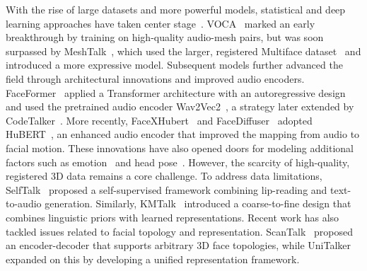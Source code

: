 \documentclass[a4paper, 10pt, conference]{ieeeconf}      %
\begin{document}
With the rise of large datasets and more powerful models, statistical and deep learning approaches have taken center stage~\cite{VOCA2019, richard2021meshtalk, Fan_Lin_Saito_Wang_Komura_faceformer_2022, facexhubert, Thambiraja_2023_ICCV_imitator, thambiraja2023_3diface, landmarks_3D_Nocentini_2023, xing2023codetalker, FaceDiffuser_Stan_MIG2023, nocentini2024scantalk3dtalkingheads, nocentini2024emovocaspeechdrivenemotional3d, nocentini2024fixedtopologiesunregisteredtraining, nocentini2026freetalkemotionaltopologyfree3d}. VOCA~\cite{VOCA2019} marked an early breakthrough by training on high-quality audio-mesh pairs, but was soon surpassed by MeshTalk~\cite{richard2021meshtalk}, which used the larger, registered Multiface dataset~\cite{wuu2022multiface} and introduced a more expressive model.
Subsequent models further advanced the field through architectural innovations and improved audio encoders. FaceFormer~\cite{Fan_Lin_Saito_Wang_Komura_faceformer_2022} applied a Transformer architecture with an autoregressive design and used the pretrained audio encoder Wav2Vec2~\cite{wav2vec_2019}, a strategy later extended by CodeTalker~\cite{xing2023codetalker}. More recently, FaceXHubert~\cite{facexhubert} and FaceDiffuser~\cite{FaceDiffuser_Stan_MIG2023} adopted HuBERT~\cite{Hubert_audio_encoding}, an enhanced audio encoder that improved the mapping from audio to facial motion.
These innovations have also opened doors for modeling additional factors such as emotion~\cite{peng2023emotalk, danvevcek2023emotional, Wu_2024} and head pose~\cite{SadTalker_2023, sun2023diffposetalk}. However, the scarcity of high-quality, registered 3D data remains a core challenge. To address data limitations, SelfTalk~\cite{peng2023selftalk} proposed a self-supervised framework combining lip-reading and text-to-audio generation. Similarly, KMTalk~\cite{xu2024kmtalkspeechdriven3dfacial} introduced a coarse-to-fine design that combines linguistic priors with learned representations.
Recent work has also tackled issues related to facial topology and representation. ScanTalk~\cite{nocentini2024scantalk3dtalkingheads} proposed an encoder-decoder that supports arbitrary 3D face topologies, while UniTalker~\cite{fan2024unitalkerscalingaudiodriven3d} expanded on this by developing a unified representation framework.
\end{document}
